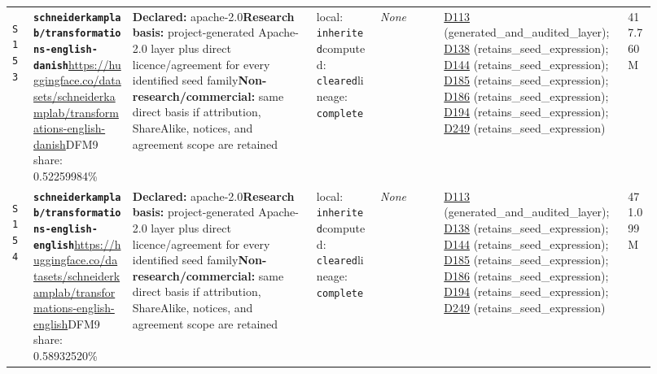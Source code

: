 \documentclass[9pt,a4paper]{article}
\newcommand{\srcid}[1]{\hypertarget{src:#1}{\texttt{#1}}}
\begin{document}
\begin{landscape}
\begin{longtable}{@{}L{0.03\linewidth}L{0.14\linewidth}L{0.26\linewidth}L{0.09\linewidth}L{0.09\linewidth}L{0.265\linewidth}L{0.045\linewidth}@{}}
\srcid{S153} & \textbf{\nolinkurl{schneiderkamplab/transformations-english-danish}}\newline \url{https://huggingface.co/datasets/schneiderkamplab/transformations-english-danish}\newline DFM9 share: 0.52259984\% & \textbf{Declared:} apache-2.0\newline \textbf{Research basis:} project-generated Apache-2.0 layer plus direct licence/agreement for every identified seed family\newline \textbf{Non-research/commercial:} same direct basis if attribution, ShareAlike, notices, and agreement scope are retained & local: \texttt{inherited}\newline computed: \texttt{cleared}\newline lineage: \texttt{complete} & \textit{None} & \hyperlink{dep:D113}{D113} (generated\_and\_audited\_layer); \hyperlink{dep:D138}{D138} (retains\_seed\_expression); \hyperlink{dep:D144}{D144} (retains\_seed\_expression); \hyperlink{dep:D185}{D185} (retains\_seed\_expression); \hyperlink{dep:D186}{D186} (retains\_seed\_expression); \hyperlink{dep:D194}{D194} (retains\_seed\_expression); \hyperlink{dep:D249}{D249} (retains\_seed\_expression) & 417.760M \\
\srcid{S154} & \textbf{\nolinkurl{schneiderkamplab/transformations-english-english}}\newline \url{https://huggingface.co/datasets/schneiderkamplab/transformations-english-english}\newline DFM9 share: 0.58932520\% & \textbf{Declared:} apache-2.0\newline \textbf{Research basis:} project-generated Apache-2.0 layer plus direct licence/agreement for every identified seed family\newline \textbf{Non-research/commercial:} same direct basis if attribution, ShareAlike, notices, and agreement scope are retained & local: \texttt{inherited}\newline computed: \texttt{cleared}\newline lineage: \texttt{complete} & \textit{None} & \hyperlink{dep:D113}{D113} (generated\_and\_audited\_layer); \hyperlink{dep:D138}{D138} (retains\_seed\_expression); \hyperlink{dep:D144}{D144} (retains\_seed\_expression); \hyperlink{dep:D185}{D185} (retains\_seed\_expression); \hyperlink{dep:D186}{D186} (retains\_seed\_expression); \hyperlink{dep:D194}{D194} (retains\_seed\_expression); \hyperlink{dep:D249}{D249} (retains\_seed\_expression) & 471.099M \\

\end{longtable}
\end{landscape}
\end{document}
